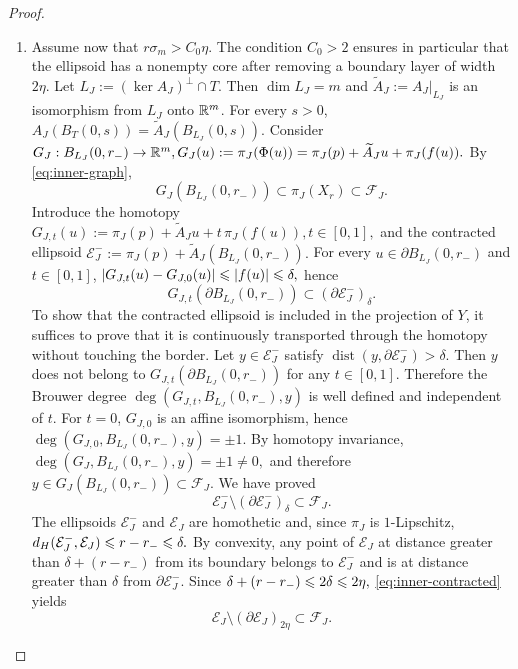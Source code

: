 \begin{proof}
\begin{enumerate}
\item Assume now that
\(r\sigma_m>C_0\eta.\)
The condition $C_0>2$ ensures in particular that the ellipsoid has a
nonempty core after removing a boundary layer of width $2\eta$.
Let
\(L_J:=(\ker A_J)^\perp\cap T.\)
Then $\dim L_J=m$ and
$\widetilde A_J:=A_J|_{L_J}$ is an isomorphism from $L_J$ onto
$\mathbb{R}^m$. For every $s>0$,
\(A_J(B_T(0,s))=\widetilde A_J(B_{L_J}(0,s)).\)
Consider
\(G_J:B_{L_J}(0,r_-)\to\mathbb{R}^m, G_J(u):=\pi_J(\Phi(u)) =\pi_J(p)+\widetilde A_Ju+\pi_J(f(u)).\)
By \eqref{eq:inner-graph},
\begin{equation}
\label{eq:G-image}
 G_J(B_{L_J}(0,r_-))\subset\pi_J(X_r)\subset\mathcal F_J.
\end{equation}
Introduce the homotopy
\(G_{J,t}(u):=\pi_J(p)+\widetilde A_Ju+t\,\pi_J(f(u)), t\in[0,1],\)
and the contracted ellipsoid
\(\mathcal E_J^-:=\pi_J(p)+\widetilde A_J(B_{L_J}(0,r_-)).\)
For every $u\in\partial B_{L_J}(0,r_-)$ and $t\in[0,1]$,
\(|G_{J,t}(u)-G_{J,0}(u)|\leqslant |f(u)|\leqslant\delta,\)
hence
\begin{equation}
\label{eq:homotopy-boundary}
 G_{J,t}(\partial B_{L_J}(0,r_-))
 \subset(\partial\mathcal E_J^-)_\delta.
\end{equation}
To show that the contracted ellipsoid is included in the projection of $Y$, it suffices to prove that it is continuously transported through the homotopy without touching the border. 
Let $y\in\mathcal E_J^-$ satisfy
$\operatorname{dist}(y,\partial\mathcal E_J^-)>\delta$. Then $y$
does not belong to
$G_{J,t}(\partial B_{L_J}(0,r_-))$ for any $t\in[0,1]$. Therefore the Brouwer degree
\(\deg(G_{J,t},B_{L_J}(0,r_-),y)\)
is well defined and independent of $t$. For $t=0$, $G_{J,0}$ is an
affine isomorphism, hence
\(\deg(G_{J,0},B_{L_J}(0,r_-),y)=\pm1.\)
By homotopy invariance,
\(\deg(G_J,B_{L_J}(0,r_-),y)=\pm1\ne0,\)
and therefore $y\in G_J(B_{L_J}(0,r_-))\subset\mathcal F_J$. We have
proved
\begin{equation}
\label{eq:inner-contracted}
 \mathcal E_J^-\setminus(\partial\mathcal E_J^-)_\delta
 \subset\mathcal F_J.
\end{equation}
The ellipsoids $\mathcal E_J^-$ and $\mathcal E_J$ are homothetic and,
since $\pi_J$ is $1$-Lipschitz,
\(d_H(\mathcal E_J^-,\mathcal E_J) \leqslant r-r_-\leqslant\delta.\)
By convexity, any point of $\mathcal E_J$ at distance greater than
$\delta+(r-r_-)$ from its boundary belongs to $\mathcal E_J^-$ and is
at distance greater than $\delta$ from $\partial\mathcal E_J^-$. Since
\(\delta+(r-r_-)\leqslant2\delta\leqslant2\eta,\)
\eqref{eq:inner-contracted} yields
\begin{equation}
\label{eq:inner-final}
 \mathcal E_J\setminus(\partial\mathcal E_J)_{2\eta}
 \subset\mathcal F_J.
\end{equation}


\end{enumerate}
\end{proof}
